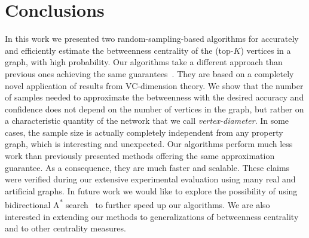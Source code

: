 \section{Conclusions}\label{sec:concl}
In this work we presented two random-sampling-based algorithms for accurately and
efficiently estimate the betweenness centrality of the (top-$K$) vertices in a
graph, with high probability.
Our algorithms take a different approach than previous ones achieving the same
guarantees~\citep{BrandesP07,GeisbergerSS08,JacobKLPT05}. They are based on a
completely novel application of results from VC-dimension theory. We show that
the number of samples needed to approximate the betweenness with the desired
accuracy and confidence does not depend on the number of vertices in the graph,
but rather on a characteristic quantity of the network that we call
\emph{vertex-diameter}. In some cases, the sample size is actually completely
independent from any property graph, which is interesting and unexpected.
Our algorithms perform much less work than previously presented methods offering
the same approximation guarantee. As a consequence, they are much faster and
scalable. These claims were verified during our extensive experimental
evaluation using many real and artificial graphs. In future work we would like
to explore the possibility of using bidirectional A\textsuperscript{*}
search~\citep{Pohl69,KaindlK97} to further speed up our algorithms.  We are also
interested in extending our methods to generalizations of betweenness
centrality~\citep{KourtellisASIT12,DolevEP10} and to other centrality measures. 

